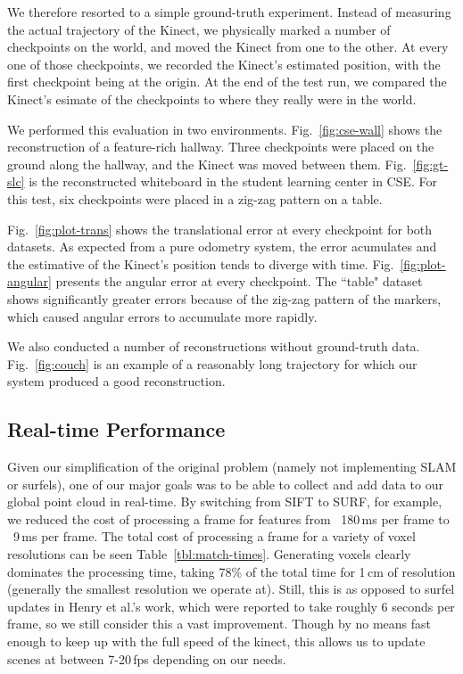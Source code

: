 \documentclass[letterpaper, 10pt, conference]{ieeeconf}
\begin{document}
We therefore resorted to a simple ground-truth experiment. Instead of measuring the actual trajectory of
the Kinect, we physically marked a number of checkpoints on the world,
and moved the Kinect from one to the other. At every one of those checkpoints, we recorded the
Kinect's estimated position, with the first checkpoint being at the origin. At the end of the
test run, we compared the Kinect's esimate of the checkpoints to where they really were in the
world.

We performed this evaluation in two environments. Fig.~\ref{fig:cse-wall} shows the reconstruction of a
feature-rich hallway. Three checkpoints were placed on the ground along the hallway, and the Kinect was
moved between them. Fig.~\ref{fig:gt-slc} is the reconstructed whiteboard in the student learning
center in CSE. For this test, six checkpoints were placed in a zig-zag pattern on a table.

Fig.~\ref{fig:plot-trans} shows the translational error at every checkpoint for both datasets.
As expected from a pure odometry system, the error acumulates and the estimative of the Kinect's
position tends to diverge with time. Fig.~\ref{fig:plot-angular} presents the angular error at
every checkpoint. The ``table" dataset shows significantly greater errors because of the
zig-zag pattern of the markers, which caused angular errors to accumulate more rapidly.

We also conducted a number of reconstructions without ground-truth data. Fig.~\ref{fig:couch}
is an example of a reasonably long trajectory for which our system produced a good
reconstruction.

\subsection{Real-time Performance}
Given our simplification of the original problem (namely not implementing SLAM
or surfels), one of our major goals was to be able to collect and add data to
our global point cloud in real-time. By switching from SIFT to SURF, for
example, we reduced the cost of processing a frame for features from
~180\,ms per frame to ~9\,ms per frame. The total cost of processing a frame
for a variety of voxel resolutions
can be seen Table~\ref{tbl:match-times}. Generating voxels clearly dominates the
processing time, taking 78\% of the total time for 1\,cm of resolution
(generally the smallest resolution we operate at). Still, this is as opposed
to surfel updates in Henry et al.'s work, which were reported to take roughly
6 seconds per frame, so we still consider this a vast improvement. Though by
no means fast enough to keep up with the full speed of the kinect, this allows
us to update scenes at between 7-20\,fps depending on our needs.
\end{document}
